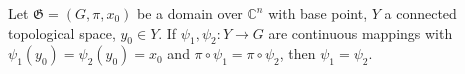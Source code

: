 Let $\mathfrak{G} = (G, \pi, x_0)$ be a domain over $\mathbb{C}^n$ with base point, $Y$ a connected topological space, $y_0 \in Y$. If $\psi_1, \psi_2: Y \to G$ are continuous mappings with $\psi_1(y_0) = \psi_2(y_0) = x_0$ and $\pi \circ \psi_1 = \pi \circ \psi_2$, then $\psi_1 = \psi_2$.
